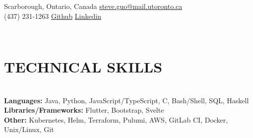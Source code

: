 \documentclass[12pt,letterpaper,roman]{moderncv}
\def \scaleFont {1.00} %
\def \headingSpace {-11mm} %
\def \skillSpacing {1mm} %
\def \sectionSpacing {-10mm} %
\begin{document}
\relscale{\scaleFont} %
\makecvtitle
\vspace*{-21mm}

\begin{center}
	\faMapO\enspace Scarborough, Ontario, Canada \qquad
  \faEnvelopeO\enspace \href{mailto:steve.guo@mail.utoronto.ca}{steve.guo@mail.utoronto.ca} \\
	\faMobile\enspace (437) 231-1263 \hspace*{22mm}
  \href{https://github.com/Epicsteve2}{\faGithub\enspace Github} \hspace*{32mm}
  \href{https://www.linkedin.com/in/stephen-guo-399959192/}{\faLinkedin\enspace Linkedin}\\
\end{center} \leavevmode\\[-24mm]

\section{TECHNICAL SKILLS} \leavevmode \\[\headingSpace]
\textbf{Languages:}
  Java,\hspace*{\skillSpacing}
  Python,\hspace*{\skillSpacing}
  JavaScript/TypeScript,\hspace*{\skillSpacing}
  C,\hspace*{\skillSpacing}
  Bash/Shell,\hspace*{\skillSpacing}
  SQL,\hspace*{\skillSpacing}
  Haskell\hspace*{\skillSpacing}\\
\textbf{Libraries/Frameworks:}
  Flutter,\hspace*{\skillSpacing}
  Bootstrap,\hspace*{\skillSpacing}
  Svelte\hspace*{\skillSpacing}\\
\textbf{Other:}
  Kubernetes,\hspace*{\skillSpacing}
  Helm,\hspace*{\skillSpacing}
  Terraform,\hspace*{\skillSpacing}
  Pulumi,\hspace*{\skillSpacing}
  AWS,\hspace*{\skillSpacing}
  GitLab CI,\hspace*{\skillSpacing}
  Docker,\hspace*{\skillSpacing}
  Unix/Linux,\hspace*{\skillSpacing}
  Git\hspace*{\skillSpacing}
\\[\sectionSpacing]
\end{document}
